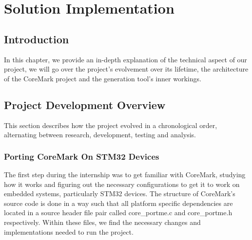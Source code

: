 
\chapter{Solution Implementation}
\label{ch:implementation}

\section*{Introduction}
In this chapter, we provide an in-depth explanation of the technical aspect of our project, we will go over the project's evolvement over its lifetime, the architecture of the CoreMark project and the generation tool's inner workings.
\section{Project Development Overview}
This section describes how the project evolved in a chronological order, alternating between research, development, testing and analysis.
\subsection{Porting CoreMark On STM32 Devices}
The first step during the internship was to get familiar with CoreMark, studying how it works and figuring out the necessary configurations to get it to work on embedded systems, particularly STM32 devices.
The structure of CoreMark's source code is done in a way such that all platform specific dependencies are located in a source header file pair called core\_portme.c and core\_portme.h respectively. Within these files, we find the necessary changes and implementations needed to run the project.
